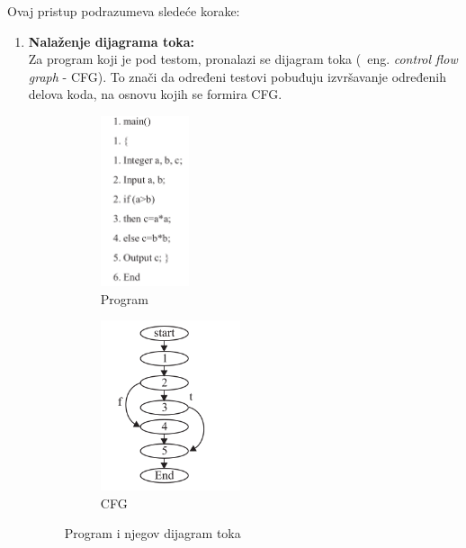 \documentclass[a4paper]{article}
\begin{document}
Ovaj pristup\cite{druginacin} podrazumeva sledeće korake:
\begin{enumerate}
    \item \textbf{Nalaženje dijagrama toka:}\\
    Za program koji je pod testom, pronalazi se dijagram toka (~eng. \textit{control flow graph} - CFG). To znači da određeni testovi pobuđuju izvršavanje određenih delova koda, na osnovu kojih se formira CFG.
        \begin{figure}[h!]

        \begin{subfigure}{0.5\textwidth}
        \centerline{\includegraphics[width=0.5\linewidth, height=5cm]{program.png}}
        \caption{Program}
        \label{fig:program}
        \end{subfigure}
        \begin{subfigure}{0.5\textwidth}
        \centerline{\includegraphics[width=0.9\linewidth, height=5cm]{CFG.png}}
        \caption{CFG}
        \label{fig:CFG}
        \end{subfigure}

        \caption{Program i njegov dijagram toka}
        \label{fig:prog_CFG}
        \end{figure}
        

\end{enumerate}
\end{document}
